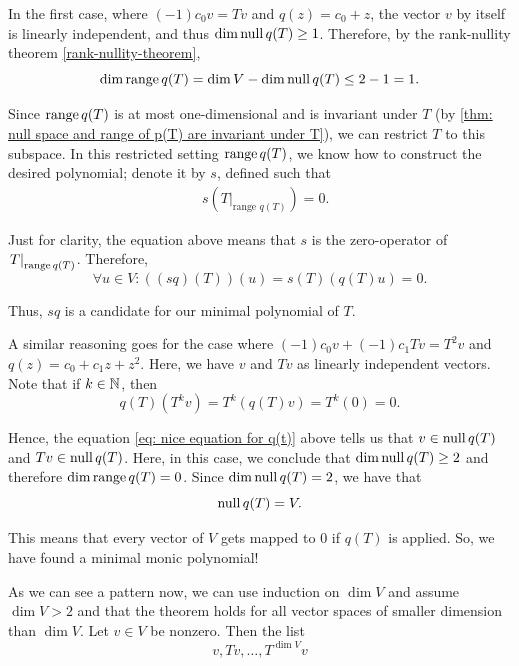 \begin{prf}
  In the first case, where $(-1)c_0v=Tv$ and $q(z)=c_0+z$, the vector $v$ by itself is linearly independent, and thus $\dim \operatorname{null} q(T) \geq 1$. Therefore, by the rank-nullity theorem \ref{rank-nullity-theorem},
  \begin{equation}
    \dim \operatorname{range} q(T) = \dim V - \dim \operatorname{null} q(T) \leq 2 - 1 = 1.
  \end{equation}

  Since $\operatorname{range} q(T)$ is at most one-dimensional and is invariant under $T$ (by \ref{thm: null space and range of p(T) are invariant under T}), we can restrict $T$ to this subspace. In this restricted setting $\operatorname{range} q(T)$, we know how to construct the desired polynomial; denote it by $s$, defined such that
  \begin{equation}
    \begin{aligned}
        &s \left(\left. T \right |_{\text{range $q(T)$}} \right)=0.
    \end{aligned}
  \end{equation}

  Just for clarity, the equation above means that $s$ is the zero-operator of $\left. T \right |_{\operatorname{range} q(T)}$. Therefore,
  \begin{equation}
    \forall u \in V: \left((sq)(T)\right)(u) = s(T)(q(T)u)=0.
  \end{equation}

  Thus, $sq$ is a candidate for our minimal polynomial of $T$.

  A similar reasoning goes for the case where $(-1)c_0v+(-1)c_1Tv=T^2v$ and $q(z) = c_0+c_1z+z^2$.
  Here, we have $v$ and $Tv$ as linearly independent vectors. Note that if $k \in \mathbb{N}$, then
  \begin{equation}
    \label{eq: nice equation for q(t)}
    q(T)(T^kv)=T^k(q(T)v) =T^k (0) =0.
  \end{equation}

  Hence, the equation \eqref{eq: nice equation for q(t)} above tells us that $v\in \operatorname{null} q(T)$ and $Tv \in \operatorname{null} q(T)$. Here, in this case, we conclude that $\dim \operatorname{null} q(T) \geq 2$ and therefore $\dim \operatorname{range} q(T) = 0$. Since $\dim \operatorname{null} q(T) = 2$, we have that
  \begin{equation}
    \operatorname{null} q(T) = V.
  \end{equation}

  This means that every vector of $V$ gets mapped to $0$ if $q(T)$ is applied. So, we have found a minimal monic polynomial!

   As we can see a pattern now, we can use induction on $\dim V$ and assume $\dim V > 2$ and that the theorem holds for all vector spaces of smaller dimension than $\dim V$.
  Let $v\in V$ be nonzero. Then the list
  \begin{equation}
    \label{eq: v Tv T^dimV}
    v, Tv, \dots, T^{\dim V}v
  \end{equation}


\end{prf}
